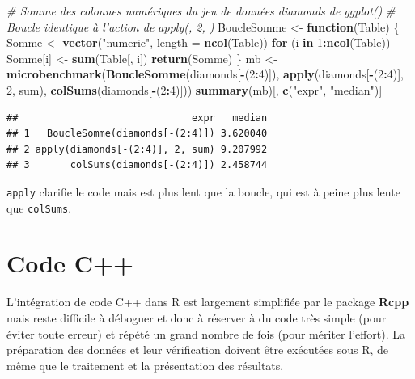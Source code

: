 \documentclass[
  12pt,
  french,
  a4paper,
  extrafontsizes,onecolumn,openright
  ]{memoir}
\newenvironment{Shaded}{\begin{snugshade}}{\end{snugshade}}
\newcommand{\CommentTok}[1]{\textcolor[rgb]{0.56,0.35,0.01}{\textit{#1}}}
\newcommand{\ControlFlowTok}[1]{\textcolor[rgb]{0.13,0.29,0.53}{\textbf{#1}}}
\newcommand{\DataTypeTok}[1]{\textcolor[rgb]{0.13,0.29,0.53}{#1}}
\newcommand{\DecValTok}[1]{\textcolor[rgb]{0.00,0.00,0.81}{#1}}
\newcommand{\KeywordTok}[1]{\textcolor[rgb]{0.13,0.29,0.53}{\textbf{#1}}}
\newcommand{\NormalTok}[1]{#1}
\newcommand{\OperatorTok}[1]{\textcolor[rgb]{0.81,0.36,0.00}{\textbf{#1}}}
\newcommand{\StringTok}[1]{\textcolor[rgb]{0.31,0.60,0.02}{#1}}
\begin{document}
\begin{Shaded}
\begin{Highlighting}[]
\CommentTok{# Somme des colonnes numériques du jeu de données diamonds de ggplot()}
\CommentTok{# Boucle identique à l'action de apply(, 2, )}
\NormalTok{BoucleSomme <-}\StringTok{ }\ControlFlowTok{function}\NormalTok{(Table) \{}
\NormalTok{  Somme <-}\StringTok{ }\KeywordTok{vector}\NormalTok{(}\StringTok{"numeric"}\NormalTok{, }\DataTypeTok{length =} \KeywordTok{ncol}\NormalTok{(Table))}
  \ControlFlowTok{for}\NormalTok{ (i }\ControlFlowTok{in} \DecValTok{1}\OperatorTok{:}\KeywordTok{ncol}\NormalTok{(Table)) Somme[i] <-}\StringTok{ }\KeywordTok{sum}\NormalTok{(Table[, i])}
  \KeywordTok{return}\NormalTok{(Somme)}
\NormalTok{\}}
\NormalTok{mb <-}\StringTok{ }\KeywordTok{microbenchmark}\NormalTok{(}\KeywordTok{BoucleSomme}\NormalTok{(diamonds[}\OperatorTok{-}\NormalTok{(}\DecValTok{2}\OperatorTok{:}\DecValTok{4}\NormalTok{)]), }
                     \KeywordTok{apply}\NormalTok{(diamonds[}\OperatorTok{-}\NormalTok{(}\DecValTok{2}\OperatorTok{:}\DecValTok{4}\NormalTok{)], }\DecValTok{2}\NormalTok{, sum), }
                     \KeywordTok{colSums}\NormalTok{(diamonds[}\OperatorTok{-}\NormalTok{(}\DecValTok{2}\OperatorTok{:}\DecValTok{4}\NormalTok{)]))}
\KeywordTok{summary}\NormalTok{(mb)[, }\KeywordTok{c}\NormalTok{(}\StringTok{"expr"}\NormalTok{, }\StringTok{"median"}\NormalTok{)]}
\end{Highlighting}
\end{Shaded}

\begin{verbatim}
##                              expr   median
## 1   BoucleSomme(diamonds[-(2:4)]) 3.620040
## 2 apply(diamonds[-(2:4)], 2, sum) 9.207992
## 3       colSums(diamonds[-(2:4)]) 2.458744
\end{verbatim}

\normalsize

\texttt{apply} clarifie le code mais est plus lent que la boucle, qui est à peine plus lente que \texttt{colSums}.

\hypertarget{sec:cpp}{%
\section{Code C++}\label{sec:cpp}}

L'intégration de code C++ dans R est largement simplifiée par le package \textbf{Rcpp} mais reste difficile à déboguer et donc à réserver à du code très simple (pour éviter toute erreur) et répété un grand nombre de fois (pour mériter l'effort).
La préparation des données et leur vérification doivent être exécutées sous R, de même que le traitement et la présentation des résultats.
\end{document}
